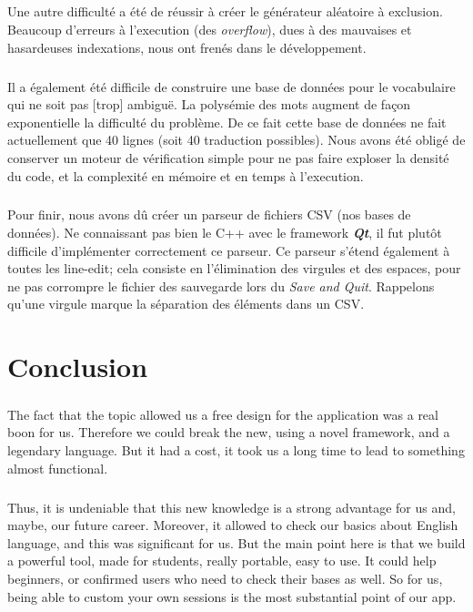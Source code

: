 \documentclass[12pt, a4paper]{report}
\begin{document}
\paragraph{}Une autre difficulté a été de réussir à créer le générateur aléatoire à exclusion. Beaucoup d'erreurs à l'execution (des \textit{overflow}), dues à des mauvaises et hasardeuses indexations, nous ont frenés dans le développement.

\paragraph{}Il a également été difficile de construire une base de données pour le vocabulaire qui ne soit pas [trop] ambiguë. La polysémie des mots augment de façon exponentielle la difficulté du problème. De ce fait cette base de données ne fait actuellement que 40 lignes (soit 40 traduction possibles). Nous avons été obligé de conserver un moteur de vérification simple pour ne pas faire exploser la densité du code, et la complexité en mémoire et en temps à l'execution.

\paragraph{}Pour finir, nous avons dû créer un parseur de fichiers CSV (nos bases de données). Ne connaissant pas bien le C++ avec le framework \textbf{\textit{Qt}}, il fut plutôt difficile d'implémenter correctement ce parseur. Ce parseur s'étend également à toutes les line-edit; cela consiste en l'élimination des virgules et des espaces, pour ne pas corrompre le fichier des sauvegarde lors du \textit{Save and Quit}. Rappelons qu'une virgule marque la séparation des éléments dans un CSV.

\newpage
\chapter*{Conclusion}

\paragraph{}The fact that the topic allowed us a free design for the application was a real boon for us. Therefore we could break the new, using a novel framework, and a legendary language. But it had a cost, it took us a long time to lead to something almost functional. 

\paragraph{}Thus, it is undeniable that this new knowledge is a strong advantage for us and, maybe, our future career. Moreover, it allowed to check our basics about English language, and this was significant for us. But the main point here is that we build a powerful tool, made for students, really portable, easy to use. It could help beginners, or confirmed users who need to check their bases as well. So for us, being able to custom your own sessions is the most substantial point of our app.
\end{document}
